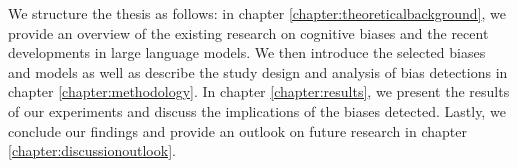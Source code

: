 \par We structure the thesis as follows: in chapter \ref{chapter:theoreticalbackground}, we provide an overview of the existing research on cognitive biases and the recent developments in large language models. We then introduce the selected biases and models as well as describe the study design and analysis of bias detections in chapter \ref{chapter:methodology}. In chapter \ref{chapter:results}, we present the results of our experiments and discuss the implications of the biases detected. Lastly, we conclude our findings and provide an outlook on future research in chapter \ref{chapter:discussionoutlook}.